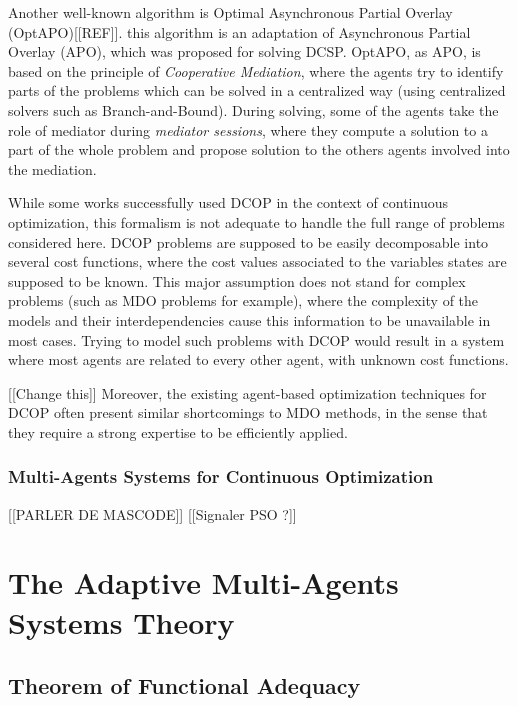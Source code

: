 Another well-known algorithm is Optimal Asynchronous Partial Overlay (OptAPO)[[REF]]. this algorithm is an adaptation of Asynchronous Partial Overlay (APO), which was proposed for solving DCSP. OptAPO, as APO, is based on the principle of \emph{Cooperative Mediation}, where the agents try to identify parts of the problems which can be solved in a centralized way (using centralized solvers such as Branch-and-Bound). During solving, some of the agents take the role of mediator during \emph{mediator sessions}, where they compute a solution to a part of the whole problem and propose solution to the others agents involved into the mediation.

While some works successfully used DCOP in the context of continuous optimization\cite{stranders2009decentralised}, this formalism is not adequate to handle the full range of problems considered here. DCOP problems are supposed to be easily decomposable into several cost functions, where the cost values associated to the variables states are supposed to be known. This major assumption does not stand for complex problems (such as MDO problems for example), where the complexity of the models and their interdependencies cause this information to be unavailable in most cases. Trying to model such problems with DCOP would result in a system where most agents are related to every other agent, with unknown cost functions.

[[Change this]]
Moreover, the existing agent-based optimization techniques for DCOP often present similar shortcomings to MDO methods, in the sense that they require a strong expertise to be efficiently applied\cite{Ka2011.6}.

\subsubsection{Multi-Agents Systems for Continuous Optimization}

[[PARLER DE MASCODE]]
[[Signaler PSO ?]]

\section{The Adaptive Multi-Agents Systems Theory}

\subsection{Theorem of Functional Adequacy}

